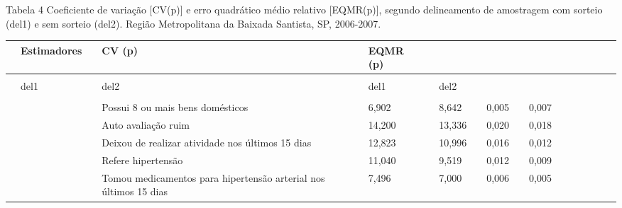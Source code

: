 \documentclass{article}
\begin{document}
Tabela 4%
Coeficiente de variação [CV(p)] e erro quadrático médio relativo [EQMR(p)], segundo delineamento de amostragem com sorteio (del1) e sem sorteio (del2). Região Metropolitana da Baixada Santista, SP, 2006-2007.%
\begin{tabular}{| l | l | l | l | l | l || l | l | l | l || l | l | l | l | l | l | l | l |}
\hline
 & Estimadores & %
 & CV (p) & %
 & EQMR (p)\\ \hline 
 & %
 & %
 & %
\\ \hline 
 & del1 & %
 & del2 & %
 & del1 & %
 & del2\\ \hline 
 & \multirow{1}{*}{\multicolumn{2}{l}{Adultos}}
 & %
 & 
 & %
 & 
 & %
 & 
\\ \hline 

 & 
 & %
 & Possui 8 ou mais bens domésticos
 & %
 & 6,902
 & %
 & 8,642
 & %
 & 0,005
 & %
 & 0,007
\\ \hline 

 & 
 & %
 & Auto avaliação ruim
 & %
 & 14,200
 & %
 & 13,336
 & %
 & 0,020
 & %
 & 0,018
\\ \hline 

 & 
 & %
 & Deixou de realizar atividade nos últimos 15 dias
 & %
 & 12,823
 & %
 & 10,996
 & %
 & 0,016
 & %
 & 0,012
\\ \hline 

 & 
 & %
 & Refere hipertensão
 & %
 & 11,040
 & %
 & 9,519
 & %
 & 0,012
 & %
 & 0,009
\\ \hline 

 & 
 & %
 & Tomou medicamentos para hipertensão arterial nos últimos 15 dias
 & %
 & 7,496
 & %
 & 7,000
 & %
 & 0,006
 & %
 & 0,005
\\ \hline 


\end{tabular}
\end{document}
